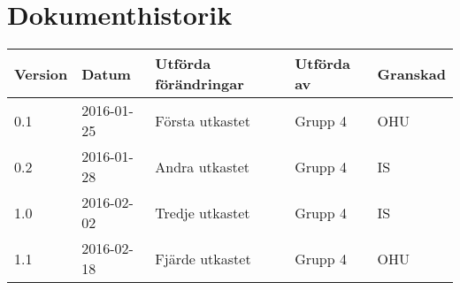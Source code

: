 \documentclass[11pt]{article}
\begin{document}
\tableofcontents

\pagebreak

\section*{Dokumenthistorik}
\begin{table}[h]
\begin{tabular}{|l|l|l|l|l|} \hline

\textbf{Version} & \textbf{Datum} & \textbf{Utförda förändringar} & \textbf{Utförda av} & \textbf{Granskad} \\ \hline
0.1 & 2016-01-25 &  Första utkastet & Grupp 4 & OHU \\ \hline
0.2 & 2016-01-28 & Andra utkastet & Grupp 4 & IS \\ \hline
1.0 & 2016-02-02 &  Tredje utkastet & Grupp 4 & IS \\ \hline
1.1 & 2016-02-18 &  Fjärde utkastet & Grupp 4 & OHU \\ \hline
\end{tabular}
\end{table}

\pagebreak
{}
\end{document}
